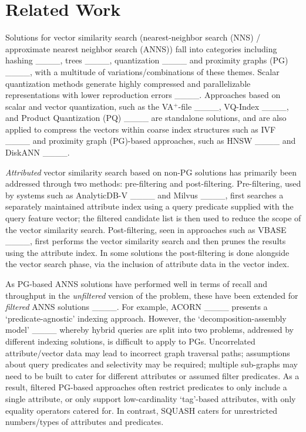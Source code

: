 \section{Related Work}
\label{s:4-squash-related-work}

Solutions for vector similarity search (nearest-neighbor search (NNS) / approximate nearest neighbor search (ANNS)) fall into categories including hashing ____, trees ____, quantization ____ and proximity graphs (PG) ____, with a multitude of variations/combinations of these themes. 
Scalar quantization methods generate highly compressed and parallelizable representations with lower reproduction errors ____. 
Approaches based on scalar and vector quantization, such as the VA$^+$-file ____, VQ-Index ____, and Product Quantization (PQ) ____ are standalone solutions, and are also applied to compress the vectors within coarse index structures such as IVF ____ and proximity graph (PG)-based approaches, such as HNSW ____ and DiskANN ____.


\textit{Attributed} vector similarity search based on non-PG solutions has primarily been addressed through two methods: pre-filtering and post-filtering. 
Pre-filtering, used by systems such as AnalyticDB-V ____ and Milvus ____, first searches a separately maintained attribute index using a query predicate supplied with the query feature vector; the filtered candidate list is then used to reduce the scope of the vector similarity search. 
Post-filtering, seen in approaches such as VBASE ____, first performs the vector similarity search and then prunes the results using the attribute index. 
In some solutions the post-filtering is done alongside the vector search phase, via the inclusion of attribute data in the vector index. 

As PG-based ANNS solutions have performed well in terms of recall and throughput in the \textit{unfiltered} version of the problem, these have been extended for \textit{filtered} ANNS solutions ____. 
For example, ACORN ____ presents a `predicate-agnostic' indexing approach. 
However, the `decomposition-assembly model' ____ whereby hybrid queries are split into two problems, addressed by different indexing solutions, is difficult to apply to PGs. 
Uncorrelated attribute/vector data may lead to incorrect graph traversal paths; assumptions about query predicates and selectivity may be required; multiple sub-graphs may need to be built to cater for different attributes or assumed filter predicates. 
As a result, filtered PG-based approaches often restrict predicates to only include a single attribute, or only support low-cardinality `tag'-based attributes, with only equality operators catered for. In contrast, SQUASH caters for unrestricted numbers/types of attributes and predicates. 

